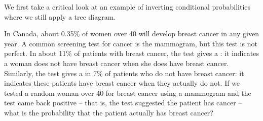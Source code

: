 We first take a critical look at an example of inverting conditional probabilities where we still apply a tree diagram.

\begin{examplewrap}
\begin{nexample}{In Canada, about 0.35\% of women over 40
    will develop breast cancer in any given year.
    A common screening test for cancer is the mammogram,
    but this test is not perfect.
    In about 11\% of patients with breast cancer, the test
    gives a :
    it indicates a woman does not have breast cancer when
    she does have breast cancer.
    Similarly, the test gives a 
    in 7\% of patients who do not have breast cancer:
    it indicates these patients have breast cancer when
    they actually do not.
    If we tested a random woman over 40 for breast cancer
    using a mammogram and the test came back positive
    -- that is, the test suggested the patient has cancer --
    what is the probability that the patient actually has
    breast cancer?}

\label{probBreastCancerGivenPositiveTestExample}


\end{nexample}
\end{examplewrap}
